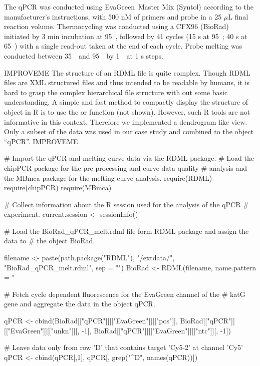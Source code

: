 The qPCR was conducted using EvaGreen\circledR~Master Mix (Syntol) according to 
the manufacturer's instructions, with 500 nM of primers and probe in a 25 
$\mu$L 
final reaction volume. Thermocycling was conducted using a CFX96 (BioRad) 
initiated by 3 min incubation at 95~\textcelsius, followed by 41 cycles (15 s 
at 
95~\textcelsius; 40 s at 65~\textcelsius) with a single read-out 
taken at the end of each cycle. Probe melting was conducted between 
35~\textcelsius~and 95~\textcelsius~by 1~\textcelsius~at 1 s steps.

IMPROVEME
The structure of an RDML file is quite complex. Though RDML files are XML 
structured files and thus intended to be readable by humans, it is hard to 
grasp the complex hierarchical file structure with out some basic understanding. 
A simple and fast method to compactly display the structure of object in R is 
to use the  or  function (not shown). However, such R 
tools are not informative in this context. Therefore we implemented a 
dendrogram like view. Only a subset of the data was used in our case study and 
combined to the object ``qPCR''.
IMPROVEME

\begin{example}
# Import the qPCR and melting curve data via the RDML package.
# Load the chipPCR package for the pre-processing and curve data quality
# analysis and the MBmca package for the melting curve analysis.
require(RDML)
require(chipPCR)
require(MBmca)

# Collect information about the R session used for the analysis of the qPCR
# experiment.
current.session <- sessionInfo()

# Load the BioRad_qPCR_melt.rdml file form RDML package and assign the data to 
# the object BioRad.

filename <- paste(path.package("RDML"), "/extdata/", 
		  "BioRad_qPCR_melt.rdml", sep = "")
BioRad <- RDML(filename, name.pattern = "%

# Fetch cycle dependent fluorescence for the EvaGreen channel of the 
# katG gene and aggregate the data in the object qPCR.

qPCR <- cbind(BioRad[["qPCR"]][["EvaGreen"]][["pos"]], 
	      BioRad[["qPCR"]][["EvaGreen"]][["unkn"]][, -1], 
	      BioRad[["qPCR"]][["EvaGreen"]][["ntc"]][, -1])
	      
# Leave data only from row 'D' that contains target 'Cy5-2' at channel 'Cy5'
qPCR <- cbind(qPCR[,1], qPCR[, grep("^D", names(qPCR))])
\end{example}

